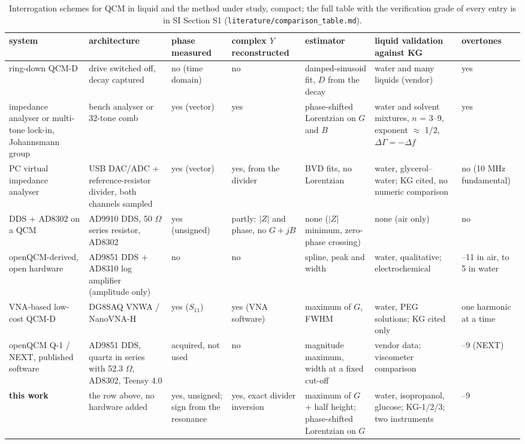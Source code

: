 \documentclass[11pt,a4paper]{article}
\begin{document}
\begin{table}[htbp]\centering\scriptsize\setlength{\tabcolsep}{2.5pt}
\caption{Interrogation schemes for QCM in liquid and the method under study, compact; the full table with the verification grade of every entry is in SI Section S1 (\texttt{literature/comparison\_table.md}).}
\begin{tabularx}{\linewidth}{>{\raggedright\arraybackslash}X>{\raggedright\arraybackslash}X>{\raggedright\arraybackslash}X>{\raggedright\arraybackslash}X>{\raggedright\arraybackslash}X>{\raggedright\arraybackslash}X>{\raggedright\arraybackslash}X}\toprule
system & architecture & phase measured & complex $Y$ reconstructed & estimator & liquid validation against KG & overtones \\\midrule
ring-down QCM-D \citep{Rodahl1995, Dixon2008} & drive switched off, decay captured & no (time domain) & no & damped-sinusoid fit, $D$ from the decay & water and many liquids (vendor) & yes \\
impedance analyser or multi-tone lock-in, Johannsmann group \citep{Johannsmann2021, Leppin2020} & bench analyser or 32-tone comb & yes (vector) & yes & phase-shifted Lorentzian on $G$ and $B$ & water and solvent mixtures, $n$ = 3--9, exponent $\approx$ 1/2, $\Delta\Gamma = -\Delta f$ & yes \\
PC virtual impedance analyser \citep{Burda2022a, Burda2022b} & USB DAC/ADC + reference-resistor divider, both channels sampled & yes (vector) & yes, from the divider & BVD fits, no Lorentzian & water, glycerol--water; KG cited, no numeric comparison & no (10 MHz fundamental) \\
DDS + AD8302 on a QCM \citep{Sakti2019} & AD9910 DDS, 50 $\Omega$ series resistor, AD8302 & yes (unsigned) & partly: $\lvert Z\rvert$ and phase, no $G + jB$ & none ($\lvert Z\rvert$ minimum, zero-phase crossing) & none (air only) & no \\
openQCM-derived, open hardware \citep{Horst2022} & AD9851 DDS + AD8310 log amplifier (amplitude only) & no & no & spline, peak and width & water, qualitative; electrochemical & 1--11 in air, to 5 in water \\
VNA-based low-cost QCM-D \citep{Munoz2023, Hardware2026NanoVNA} & DG8SAQ VNWA / NanoVNA-H & yes ($S_{11}$) & yes (VNA software) & maximum of $G$, FWHM & water, PEG solutions; KG cited only & one harmonic at a time \\
openQCM Q-1 / NEXT, published software \citep{openQCMQ1, openQCMNEXT, openQCMDissipationPost2025} & AD9851 DDS, quartz in series with 52.3 $\Omega$, AD8302, Teensy 4.0 & acquired, not used & no & magnitude maximum, width at a fixed cut-off & vendor data; viscometer comparison \citep{MirandaMartinez2021} & 1--9 (NEXT) \\
\textbf{this work} & the row above, no hardware added & yes, unsigned; sign from the resonance & yes, exact divider inversion & maximum of $G$ + half height; phase-shifted Lorentzian on $G$ & water, isopropanol, glucose; KG-1/2/3; two instruments & 1--9 \\
\bottomrule
\end{tabularx}\end{table}
\end{document}

